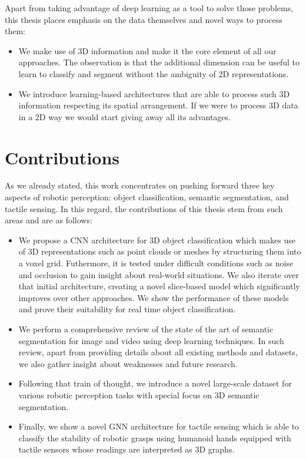 Apart from taking advantage of deep learning as a tool to solve those problems, this thesis places emphasis on the data themselves and novel ways to process them:

\begin{itemize}
    \item We make use of \ac{3D} information and make it the core element of all our approaches. The observation is that the additional dimension can be useful to learn to classify and segment without the ambiguity of \ac{2D} representations.
    \item We introduce learning-based architectures that are able to process such \ac{3D} information respecting its spatial arrangement. If we were to process \ac{3D} data in a \ac{2D} way we would start giving away all its advantages.
\end{itemize}

\section{Contributions}
\label{cha:introduction:sec:contributions}

As we already stated, this work concentrates on pushing forward three key aspects of robotic perception: object classification, semantic segmentation, and tactile sensing. In this regard, the contributions of this thesis stem from such areas and are as follows:

\begin{itemize}
    \item We propose a \acl{CNN} architecture for \acs{3D} object classification which makes use of \acs{3D} representations such as point clouds or meshes by structuring them into a voxel grid. Futhermore, it is tested under difficult conditions such as noise and occlusion to gain insight about real-world situations. We also iterate over that initial architecture, creating a novel slice-based model which significantly improves over other approaches. We show the performance of these models and prove their suitability for real time object classification.
    \item We perform a comprehensive review of the state of the art of semantic segmentation for image and video using deep learning techniques. In such review, apart from providing details about all existing methods and datasets, we also gather insight about weaknesses and future research.
    \item Following that train of thought, we introduce a novel large-scale dataset for various robotic perception tasks with special focus on 3D semantic segmentation.
    \item Finally, we show a novel \acl{GNN} architecture for tactile sensing which is able to classify the stability of robotic grasps using humanoid hands equipped with tactile sensors whose readings are interpreted as \acs{3D} graphs.
\end{itemize}

